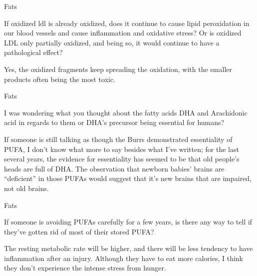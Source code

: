 \documentclass[11pt,oneside,openany,extrafontsizes]{memoir}
\begin{document}
\begin{qaexchange}{Fats}

    \begin{question}
        If oxidized ldl is already oxidized, does it continue to cause lipid peroxidation in our blood vessels and cause inflammation and oxidative stress? Or is oxidized LDL only partially oxidized, and being so, it would continue to have a pathological effect?
    \end{question}

    \begin{answer}
        Yes, the oxidized fragments keep spreading the oxidation, with the smaller products often being the most toxic.
    \end{answer}
\end{qaexchange}

\begin{qaexchange}{Fats}

    \begin{question}
        I was wondering what you thought about the fatty acids DHA and Arachidonic acid in regards to them or DHA's precursor being essential for humans?
    \end{question}

    \begin{answer}
        If someone is still talking as though the Burrs demonstrated essentiality of PUFA, I don't know what more to say besides what I've written; for the last several years, the evidence for essentiality has seemed to be that old people's heads are full of DHA. The observation that newborn babies' brains are \enquote{deficient} in those PUFAs would suggest that it's new brains that are impaired, not old brains.
    \end{answer}
\end{qaexchange}

\begin{qaexchange}{Fats}

    \begin{question}
        If someone is avoiding PUFAs carefully for a few years, is there any way to tell if they've gotten rid of most of their stored PUFA?
    \end{question}

    \begin{answer}
      The resting metabolic rate will be higher, and there will be less tendency to have inflammation after an injury. Although they have to eat more calories, I think they don't experience the intense stress from hunger.
    \end{answer}
\end{qaexchange}
\end{document}
